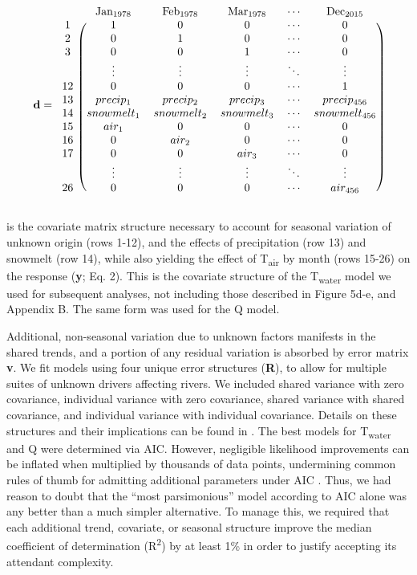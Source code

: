 \documentclass[notitlepage]{article}
\begin{document}
$$
\textbf{d} = \begin{blockarray}{cccccc}
& \textrm{Jan}_{1978} & \textrm{Feb}_{1978} & \textrm{Mar}_{1978} & \cdots & \textrm{Dec}_{2015} \\
\begin{block}{c(ccccc)}
    1 & 1 & 0 & 0 & \cdots & 0 \\
    2 & 0 & 1 & 0 & \cdots & 0 \\
    3 & 0 & 0 & 1 & \cdots & 0 \\
      & \vdots & \vdots & \vdots & \ddots & \vdots \\
    12 & 0 & 0 & 0 & \cdots & 1 \\
    13 & precip_1 & precip_2 & precip_3 & \cdots & precip_{456} \\
    14 & snowmelt_1 & snowmelt_2 & snowmelt_3 & \cdots & snowmelt_{456} \\
    15 & air_1 & 0 & 0 & \cdots & 0 \\
    16 & 0 & air_2 & 0 & \cdots & 0 \\
    17 & 0 & 0 & air_3 & \cdots & 0 \\
      & \vdots & \vdots & \vdots & \ddots & \vdots \\
    26 & 0 & 0 & 0 & \cdots & air_{456} \\
\end{block}
\end{blockarray}
$$

\noindent
is the covariate matrix structure necessary to account for seasonal variation of unknown origin (rows 1-12), and the effects of precipitation (row 13) and snowmelt (row 14), while also yielding the effect of T\textsubscript{air} by month (rows 15-26) on the response (\textbf{y}; Eq. 2). This is the covariate structure of the T\textsubscript{water} model we used for subsequent analyses, not including those described in Figure 5d-e, and Appendix B. The same form was used for the Q model.

Additional, non-seasonal variation due to unknown factors manifests in the shared trends, and a portion of any residual variation is absorbed by error matrix \textbf{v}. We fit models using four unique error structures (\textbf{R}), to allow for multiple suites of unknown drivers affecting rivers. We included shared variance with zero covariance, individual variance with zero covariance, shared variance with shared covariance, and individual variance with individual covariance. Details on these structures and their implications can be found in \citep{holmes2012marss}. The best models for T\textsubscript{water} and Q were determined via AIC. However, negligible likelihood improvements can be inflated when multiplied by thousands of data points, undermining common rules of thumb for admitting additional parameters under AIC \citep{burnham2003model}. Thus, we had reason to doubt that the ``most parsimonious'' model according to AIC alone was any better than a much simpler alternative. To manage this, we required that each additional trend, covariate, or seasonal structure improve the median coefficient of determination (R\textsuperscript{2}) by at least 1\% in order to justify accepting its attendant complexity.
\end{document}

